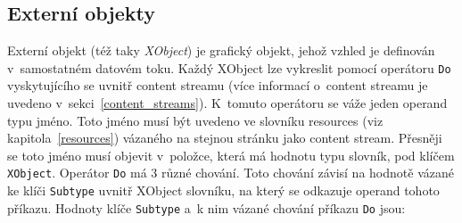 \subsection*{Externí objekty} \label{XObject}
Externí objekt (též taky \emph{XObject}) je grafický objekt, jehož vzhled
je definován v~samostatném datovém toku.
Každý XObject lze vykreslit pomocí operátoru \texttt{Do} vyskytujícího se uvnitř
content streamu (více informací o~content streamu je uvedeno 
v~sekci~\ref{content_streams}). K~tomuto operátoru se váže jeden operand typu 
jméno. Toto jméno
musí být uvedeno ve slovníku resources (viz kapitola~\ref{resources}) vázaného
na stejnou stránku jako content stream. Přesněji se toto jméno musí objevit
v~položce, která má hodnotu typu slovník, pod klíčem \texttt{XObject}. Operátor
\texttt{Do} má 3 různé chování. Toto chování závisí na hodnotě vázané ke klíči
\texttt{Subtype} uvnitř XObject slovníku, na který se odkazuje operand tohoto
příkazu. Hodnoty klíče \texttt{Subtype} a~k nim vázané chování příkazu
\texttt{Do} jsou:
